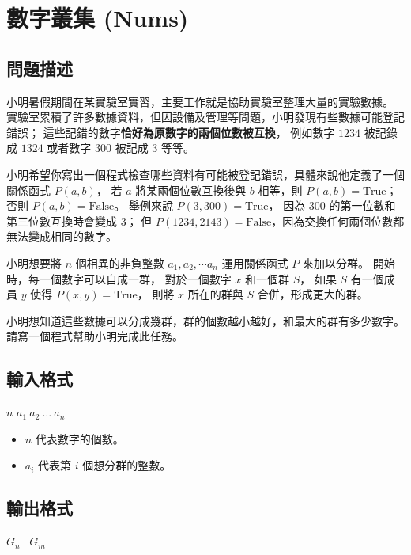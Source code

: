 \section{數字叢集 (Nums)}

\subsection{問題描述}

小明暑假期間在某實驗室實習，主要工作就是協助實驗室整理大量的實驗數據。
實驗室累積了許多數據資料，但因設備及管理等問題，小明發現有些數據可能登記錯誤；
這些記錯的數字\textbf{恰好為原數字的兩個位數被互換}， 例如數字 \(1234\)
被記錄成 \(1324\) 或者數字 \(300\) 被記成 \(3\) 等等。

小明希望你寫出一個程式檢查哪些資料有可能被登記錯誤，具體來說他定義了一個關係函式
\(P(a, b)\)， 若 \(a\) 將某兩個位數互換後與 \(b\) 相等，則
\(P(a, b) = \text{True}\)；否則 \(P(a, b) = \text{False}\)。 舉例來說
\(P(3, 300) = \text{True}\)， 因為 \(300\)
的第一位數和第三位數互換時會變成 \(3\)； 但
\(P(1234, 2143) = \text{False}\)，因為交換任何兩個位數都無法變成相同的數字。

小明想要將 \(n\) 個相異的非負整數 \(a_1, a_2, \cdots a_n\) 運用關係函式
\(P\) 來加以分群。 開始時，每一個數字可以自成一群， 對於一個數字 \(x\)
和一個群 \(S\)， 如果 \(S\) 有一個成員 \(y\) 使得
\(P(x, y) = \text{True}\)， 則將 \(x\) 所在的群與 \(S\)
合併，形成更大的群。

小明想知道這些數據可以分成幾群，群的個數越小越好，和最大的群有多少數字。請寫一個程式幫助小明完成此任務。

\subsection{輸入格式}

\begin{format}
\f{
$n$
$a_1 \ a_2 \ \ldots \ a_n$
}
\end{format}

\begin{itemize}
\tightlist
\item
  \(n\) 代表數字的個數。
\item
  \(a_i\) 代表第 \(i\) 個想分群的整數。
\end{itemize}

\subsection{輸出格式}

\begin{format}
\f{
$G_n$ \ $G_m$
}
\end{format}

